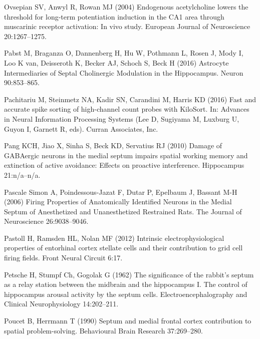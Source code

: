 \documentclass[
  12pt,
  a4paper,
  openany]{book}
\newlength{\cslhangindent}
\newlength{\cslentryspacingunit} %
\newenvironment{CSLReferences}[2] %
 {%
  \setlength{\parindent}{0pt}
  \ifodd #1
  \let\oldpar\par
  \def\par{\hangindent=\cslhangindent\oldpar}
  \fi
  \setlength{\parskip}{#2\cslentryspacingunit}
 }%
 {}
\begin{document}
\begin{CSLReferences}{1}{0}
\leavevmode{}%
Ovsepian SV, Anwyl R, Rowan MJ (2004) Endogenous acetylcholine lowers the threshold for long-term potentiation induction in the {CA1} area through muscarinic receptor activation: In vivo study. European Journal of Neuroscience 20:1267--1275.

\leavevmode{}%
Pabst M, Braganza O, Dannenberg H, Hu W, Pothmann L, Rosen J, Mody I, Loo K van, Deisseroth K, Becker AJ, Schoch S, Beck H (2016) Astrocyte {Intermediaries} of {Septal} {Cholinergic} {Modulation} in the {Hippocampus}. Neuron 90:853--865.

\leavevmode{}%
Pachitariu M, Steinmetz NA, Kadir SN, Carandini M, Harris KD (2016) Fast and accurate spike sorting of high-channel count probes with {KiloSort}. In: Advances in {Neural} {Information} {Processing} {Systems} (Lee D, Sugiyama M, Luxburg U, Guyon I, Garnett R, eds). Curran Associates, Inc.

\leavevmode{}%
Pang KCH, Jiao X, Sinha S, Beck KD, Servatius RJ (2010) Damage of {GABAergic} neurons in the medial septum impairs spatial working memory and extinction of active avoidance: {Effects} on proactive interference. Hippocampus 21:n/a--n/a.

\leavevmode{}%
Pascale Simon A, Poindessous-Jazat F, Dutar P, Epelbaum J, Bassant M-H (2006) Firing {Properties} of {Anatomically} {Identified} {Neurons} in the {Medial} {Septum} of {Anesthetized} and {Unanesthetized} {Restrained} {Rats}. The Journal of Neuroscience 26:9038--9046.

\leavevmode{}%
Pastoll H, Ramsden HL, Nolan MF (2012) Intrinsic electrophysiological properties of entorhinal cortex stellate cells and their contribution to grid cell firing fields. Front Neural Circuit 6:17.

\leavevmode{}%
Petsche H, Stumpf Ch, Gogolak G (1962) The significance of the rabbit's septum as a relay station between the midbrain and the hippocampus {I}. {The} control of hippocampus arousal activity by the septum cells. Electroencephalography and Clinical Neurophysiology 14:202--211.

\leavevmode{}%
Poucet B, Herrmann T (1990) Septum and medial frontal cortex contribution to spatial problem-solving. Behavioural Brain Research 37:269--280.


\end{CSLReferences}
\end{document}
